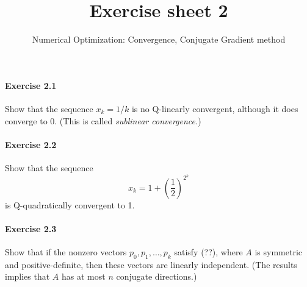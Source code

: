 
\title{Exercise sheet 2}
\subtitle{Numerical Optimization: Convergence, Conjugate Gradient method}
\usepackage{amsmath}
\newcommand\tp{\ensuremath{\text{\upshape T}}}

\maketitle

\paragraph{Exercise 2.1} %
Show that the sequence $x_k=1/k$ is no Q-linearly convergent, although it does converge to $0$. (This is called \emph{sublinear convergence.})

\paragraph{Exercise 2.2} %
Show that the sequence
\[
x_k = 1 + \left(\frac{1}{2}\right)^{2^k}
\]
is Q-quadratically convergent to 1.




\paragraph{Exercise 2.3}  %
Show that if the nonzero vectors $p_0, p_1,\dots, p_k$ satisfy (??), where $A$
is symmetric and positive-definite, then these vectors are linearly
independent. (The results implies that $A$ has at most $n$ conjugate
directions.)

